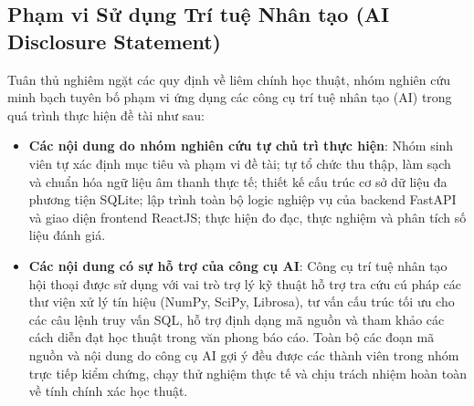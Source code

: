 \subsection{Phạm vi Sử dụng Trí tuệ Nhân tạo (AI Disclosure Statement)}
Tuân thủ nghiêm ngặt các quy định về liêm chính học thuật, nhóm nghiên cứu minh bạch tuyên bố phạm vi ứng dụng các công cụ trí tuệ nhân tạo (AI) trong quá trình thực hiện đề tài như sau:
\begin{itemize}
    \item \textbf{Các nội dung do nhóm nghiên cứu tự chủ trì thực hiện}: Nhóm sinh viên tự xác định mục tiêu và phạm vi đề tài; tự tổ chức thu thập, làm sạch và chuẩn hóa ngữ liệu âm thanh thực tế; thiết kế cấu trúc cơ sở dữ liệu đa phương tiện SQLite; lập trình toàn bộ logic nghiệp vụ của backend FastAPI và giao diện frontend ReactJS; thực hiện đo đạc, thực nghiệm và phân tích số liệu đánh giá.
    \item \textbf{Các nội dung có sự hỗ trợ của công cụ AI}: Công cụ trí tuệ nhân tạo hội thoại được sử dụng với vai trò trợ lý kỹ thuật hỗ trợ tra cứu cú pháp các thư viện xử lý tín hiệu (NumPy, SciPy, Librosa), tư vấn cấu trúc tối ưu cho các câu lệnh truy vấn SQL, hỗ trợ định dạng mã nguồn và tham khảo các cách diễn đạt học thuật trong văn phong báo cáo. Toàn bộ các đoạn mã nguồn và nội dung do công cụ AI gợi ý đều được các thành viên trong nhóm trực tiếp kiểm chứng, chạy thử nghiệm thực tế và chịu trách nhiệm hoàn toàn về tính chính xác học thuật.
\end{itemize}

